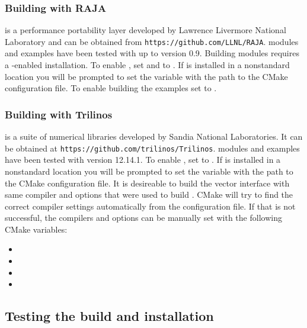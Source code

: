 \subsubsection*{Building with RAJA}
{\raja} is a performance portability layer developed by Lawrence Livermore
National Laboratory and can be obtained from {\tt https://github.com/LLNL/RAJA}.
{\sundials} {\raja} modules and examples have been tested with {\raja} up to
version 0.9. Building {\sundials} {\raja} modules requires a {\cuda}-enabled
{\raja} installation. To enable {\raja}, set  and
 to . If {\raja} is installed in a nonstandard location
you will be prompted to set the variable  with the path to the
{\raja} CMake configuration file. To enable building the {\raja} examples set
 to .

\subsubsection*{Building with Trilinos}
{\trilinos} is a suite of numerical libraries developed by Sandia National
Laboratories. It can be obtained at {\tt https://github.com/trilinos/Trilinos}.
{\sundials} {\trilinos} modules and examples have been tested with {\trilinos}
version 12.14.1. To enable {\trilinos}, set
 to . If {\trilinos} is
installed in a nonstandard location you will be prompted to set the
variable  with the path to the {\trilinos} CMake
configuration file. It is desireable to build the {\trilinos} vector interface
with same compiler and options that were used to build {\trilinos}.
CMake will try to find the correct compiler settings automatically from the
{\trilinos} configuration file. If that is not successful,
the compilers and options can be manually set with the following CMake variables:
\begin{itemize}
\item
{}
\item
{}
\item
{}
\item
{}
\end{itemize}

\subsection{Testing the build and installation}

